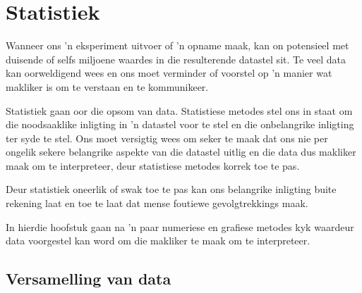 \chapter{Statistiek}


Wanneer ons 'n eksperiment uitvoer of 'n opname maak, kan on potensieel met duisende of selfs miljoene waardes in die resulterende datastel sit. Te veel data kan oorweldigend wees en ons moet verminder of voorstel op 'n manier wat makliker is om te verstaan en te kommunikeer.\par 

Statistiek gaan oor die opsom van data. Statistiese metodes stel ons in staat om die noodsaaklike inligting in 'n datastel voor te stel en die onbelangrike inligting ter syde te stel. Ons moet versigtig wees om seker te maak dat ons nie per ongelik sekere belangrike aspekte van die datastel uitlig en die data dus makliker maak om te interpreteer, deur statistiese metodes korrek toe te pas. \par

Deur statistiek oneerlik of swak toe te pas kan ons belangrike inligting buite rekening laat en toe te laat dat mense foutiewe gevolgtrekkings maak. \par

In hierdie hoofstuk gaan na 'n paar numeriese en grafiese metodes kyk waardeur data voorgestel kan word om die makliker te maak om te interpreteer.\par



\par
{}

\section{Versamelling van data}

